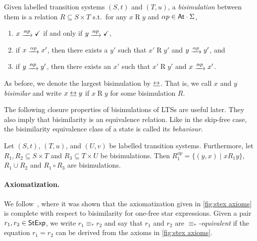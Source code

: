 \documentclass[orivec,envcountsect,envcountsame]{llncs}
\begin{document}
    \begin{definition}\label{def:p bisim}
        Given labelled transition systems \((S, t)\) and \((T, u)\), a \emph{bisimulation} between them is a relation \(R \subseteq S \times T\) s.t.\ for any \(x \mathrel{R} y\) and \(\alpha p \in \mathsf{At}\cdot \Sigma\),
        \begin{enumerate}
            \item \(x \tr{\alpha p} \checkmark\) if and only if \(y \tr{\alpha  p} \checkmark\),
            \item if \(x \tr{\alpha p} x'\), then there exists a $y'$ such that \(x' \mathrel{R} y'\) and \(y \tr{\alpha p} y'\), and
            \item if \(y \tr{\alpha p} y'\), then there exists an $x'$ such that \(x' \mathrel{R} y'\) and \(x \tr{\alpha p} x'\).
        \end{enumerate}
       As before, we denote the largest bisimulation by $\bisim$.
       That is, we call \(x\) and \(y\) \emph{bisimilar} and write \(x \bisim y\) if \(x \mathrel{R} y\) for some bisimulation $R$.
    \end{definition}

    The following closure properties of bisimulations of LTSs are useful later.
    They also imply that bisimilarity is an equivalence relation.
    Like in the skip-free case, the bisimilarity equivalence class of a state is called its \emph{behaviour}.

    \begin{lemma}\label{lem:bisim facts}
        Let \((S, t)\), \((T, u)\), and \((U, v)\) be labelled transition systems.
        Furthermore, let \(R_1, R_2 \subseteq S \times T\) and \(R_3 \subseteq T \times U\) be bisimulations.
        Then \(R_1 ^{op} = \{(y, x) \mid x \mathrel{R_1} y\}\), \(R_1 \cup R_2\) and \(R_1 \circ R_3\) are bisimulations.
    \end{lemma}


    \paragraph*{\bf Axiomatization.}
    We follow~\cite{onefreeregexlics}, where it was shown that the axiomatization given in \cref{fig:stex axioms} is complete with respect to bisimilarity for one-free star expressions.
    Given a pair \(r_1, r_2 \in \mathsf{StExp}\), we write \(r_1 \equiv_* r_2\) and say that \(r_1\) and \(r_2\) are \emph{\(\equiv_*\)-equivalent} if the equation \(r_1 = r_2\) can be derived from the axioms in \cref{fig:stex axioms}.
\end{document}
